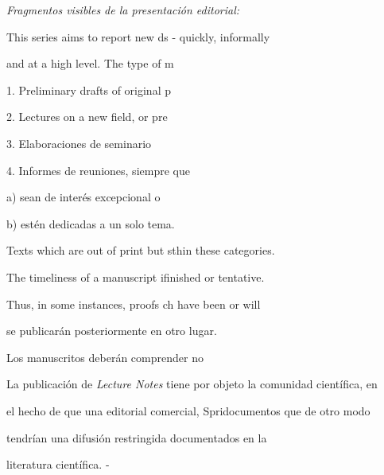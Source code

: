 \noindent
\textit{Fragmentos visibles de la presentación editorial:}\par
This series aims to report new ds - quickly, informally\par
and at a high level. The type of m\par
1. Preliminary drafts of original p\par
2. Lectures on a new field, or pre\par
3. Elaboraciones de seminario\par
4. Informes de reuniones, siempre que \par
\hspace*{1em}a) sean de interés excepcional o \par
\hspace*{1em}b) estén dedicadas a un solo tema.\par
Texts which are out of print but sthin these categories.\par
The timeliness of a manuscript ifinished or tentative.\par
Thus, in some instances, proofs ch have been or will\par
se publicarán posteriormente en otro lugar.\par
Los manuscritos deberán comprender no \par
La publicación de \textit{Lecture Notes} tiene por objeto la comunidad científica, en\par
el hecho de que una editorial comercial, Spridocumentos que de otro modo\par
tendrían una difusión restringida documentados en la\par
literatura científica. -\par

